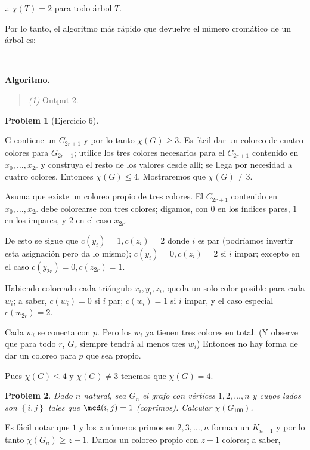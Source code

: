 \documentclass[a4paper]{article}
\newtheorem{problem}{Problem}
\newtheorem{problem}{Problem}
\begin{document}
$\therefore $ $\chi(T) = 2$ para todo árbol $T$.

Por lo tanto, el algoritmo más rápido que devuelve el número cromático de un
árbol es:

~

\textbf{Algoritmo.} 
\begin{quote}
    \textit{(1)} Output 2.
\end{quote}

\pagebreak

\begin{problem}[Ejercicio 6]
\end{problem} 

G contiene un $C_{2r + 1}$ y por lo tanto $\chi(G) \geq 3$. Es fácil dar un
coloreo de cuatro colores para $G_{2r+1}$; utilice los tres colores necesarios
para el $C_{2r+1}$ contenido en $x_0, \ldots, x_{2r}$ y construya el resto de
los valores desde allí; se llega por necesidad a cuatro colores. Entonces
$\chi(G) \leq 4$. Mostraremos que $\chi(G) \neq 3$.

Asuma que existe un coloreo propio de tres colores. El $C_{2r+1}$ contenido en
$x_0, \ldots, x_{2r}$ debe colorearse con tres colores; digamos, con $0$ en los
índices pares, $1$ en los impares, y $2$ en el caso $x_{2r}$.

De esto se sigue que $c(y_i) = 1, c(z_i) = 2$ donde $i$ es par (podríamos
invertir esta asignación pero da lo mismo); $c(y_i) = 0, c(z_i) = 2$ si $i$
impar; excepto en el caso $c(y_{2r}) = 0, c(z_{2r}) = 1$.

Habiendo coloreado cada triángulo $x_i, y_i, z_i$, queda un solo color posible
para cada $w_i$; a saber, $c(w_i) = 0$ si $i$ par; $c(w_i) = 1$ si $i$ impar, y
el caso especial $c(w_{2r}) = 2$.

Cada $w_i$ se conecta con $p$. Pero los $w_i$ ya tienen tres colores en total.
(Y observe que para todo $r$, $G_r$ siempre tendrá al menos tres $w_i$) Entonces
no hay forma de dar un coloreo para $p$ que sea propio.

Pues $\chi(G) \leq 4$ y $\chi(G) \neq 3$ tenemos que $\chi(G) = 4$.
\pagebreak
\begin{problem}
    Dado $n$ natural, sea $G_n$ el grafo con vértices $1, 2, \ldots, n$ y cuyos
    lados son $\left\{ i, j \right\} $ tales que $\mcd(i, j) = 1$ (coprimos).
    Calcular $\chi(G_{100})$.
\end{problem}

Es fácil notar que $1$ y los $z$ números primos en $2, 3, \ldots, n$ forman un
$K_{n+1}$ y por lo tanto $\chi(G_{n}) \geq z + 1$. Damos un coloreo propio con $z +
1$ colores; a saber,
\end{document}
